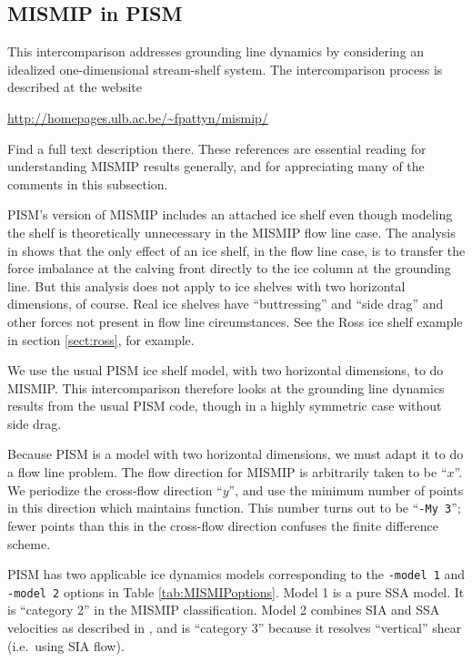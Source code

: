 \documentclass[11pt,final]{amsart}
\begin{document}
\subsection{MISMIP in PISM}\label{subsect:MISMIP}  This intercomparison addresses grounding line dynamics by considering an idealized one-dimensional stream-shelf system.  The intercomparison process is described at the website

\centerline{\url{http://homepages.ulb.ac.be/~fpattyn/mismip/}}

\noindent Find a full text description there.  These references are essential reading for understanding MISMIP results generally, and for appreciating many of the comments in this subsection.

PISM's version of MISMIP includes an attached ice shelf even though modeling the shelf is theoretically unnecessary in the MISMIP flow line case.  The analysis in \cite{SchoofMarine1} shows that the only effect of an ice shelf, in the flow line case, is to transfer the force imbalance at the calving front directly to the ice column at the grounding line.  But this analysis does not apply to ice shelves with two horizontal dimensions, of course.  Real ice shelves have ``buttressing'' and ``side drag'' and other forces not present in flow line circumstances.  See the Ross ice shelf example in section \ref{sect:ross}, for example.

We use the usual PISM ice shelf model, with two horizontal dimensions, to do MISMIP.  This intercomparison therefore looks at the grounding line dynamics results from the usual PISM code, though in a highly symmetric case without side drag.

Because PISM is a model with two horizontal dimensions, we must adapt it to do a flow line problem.  The flow direction for MISMIP is arbitrarily taken to be ``$x$''.  We periodize the cross-flow direction ``$y$'', and use the minimum number of points in this direction which maintains function.  This number turns out to be ``\verb|-My 3|''; fewer points than this in the cross-flow direction confuses the finite difference scheme.

PISM has two applicable ice dynamics models corresponding to the \verb|-model 1| and \verb|-model 2| options in Table \ref{tab:MISMIPoptions}.  Model 1 is a pure SSA model.  It is ``category 2'' in the MISMIP classification.  Model 2 combines SIA and SSA velocities as described in \cite{BBssasliding}, and is ``category 3'' because it resolves ``vertical'' shear (i.e.~using SIA flow).
\end{document}
